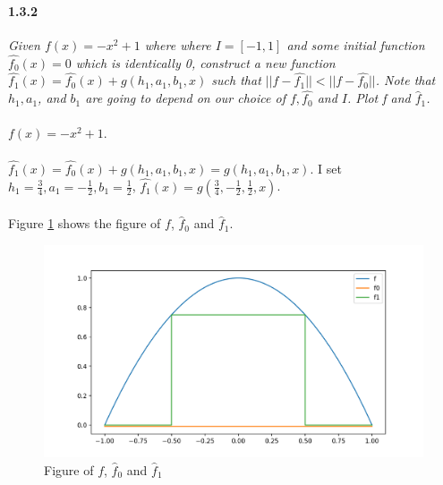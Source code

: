 \documentclass{myhw}
\begin{document}
\begin{homeworkProblem}
\begin{homeworkSection}
\paragraph{1.3.2} 
\emph{Given $f(x) = -x^2 + 1$ where where $I=[-1,1]$ and some initial function $\hat{f_0}(x)=0$ which is identically 0, construct a new function $\hat{f_1}(x) = \hat{f_0}(x) + g(h_1, a_1, b_1, x)$ such that $||f - \hat{f_1}|| < ||f - \hat{f_0}||$. Note that $h_1, a_1$, and $b_1$ are going to depend on our choice of $f, \hat{f_0}$ and $I$. Plot f and $\hat{f}_1$. } \\
\\
$f(x)=-x^2 + 1$. \\
\\
$\hat{f_1}(x) = \hat{f_0}(x) + g(h_1, a_1, b_1, x) = g(h_1, a_1, b_1, x)$. I set $h_1=\frac{3}{4}, a_1=-\frac{1}{2}, b_1=\frac{1}{2}$, $\hat{f_1}(x) = g(\frac{3}{4}, -\frac{1}{2}, \frac{1}{2}, x)$. \\
\\
Figure \ref{fig:q1.1} shows the figure of $f$, $\hat{f}_0$ and $\hat{f}_1$.
\begin{figure}[ht]
  \centering
  \includegraphics[width=.8\textwidth]{a1.png} 
  \caption{Figure of $f$, $\hat{f}_0$ and $\hat{f}_1$}
  \label{fig:q1.1}
\end{figure}

\end{homeworkSection}
\end{homeworkProblem}
\end{document}
